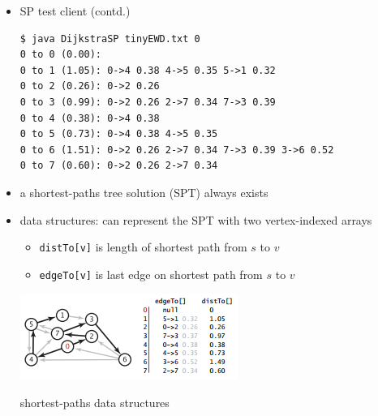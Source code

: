 \documentclass[8pt,a4paper,compress]{beamer}
\begin{document}
\begin{frame}[fragile]
\begin{itemize}
\item SP test client (contd.)
\begin{lstlisting}[language={}]
$ java DijkstraSP tinyEWD.txt 0
0 to 0 (0.00):
0 to 1 (1.05): 0->4 0.38 4->5 0.35 5->1 0.32
0 to 2 (0.26): 0->2 0.26
0 to 3 (0.99): 0->2 0.26 2->7 0.34 7->3 0.39
0 to 4 (0.38): 0->4 0.38
0 to 5 (0.73): 0->4 0.38 4->5 0.35
0 to 6 (1.51): 0->2 0.26 2->7 0.34 7->3 0.39 3->6 0.52
0 to 7 (0.60): 0->2 0.26 2->7 0.34
\end{lstlisting}

\item a shortest-paths tree solution (SPT) always exists

\item data structures: can represent the SPT with two vertex-indexed arrays
\begin{itemize}
\item \lstinline{distTo[v]} is length of shortest path from $s$ to $v$

\item \lstinline{edgeTo[v]} is last edge on shortest path from $s$ to $v$
\end{itemize}

\begin{center}
\includegraphics[scale=0.4]{./figures/sp2.png}

\smallskip

\small shortest-paths data structures
\end{center}
\end{itemize}
\end{frame}
\end{document}
